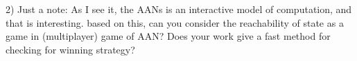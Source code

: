 \documentclass[11pt]{article}
\newcommand{\ilanswer}[1]{\textcolor{blue}{#1}}
\newcommand{\answer}[1]{\ilanswer{#1}\vspace*{1em}}
\begin{document}
% 



2) Just a note: As I see it, the AANs is an interactive model of computation, and that is interesting. based on this, can you consider the reachability of state as a game in (multiplayer) game of AAN? Does  your work give a fast method for checking for winning strategy?   
\end{document}
